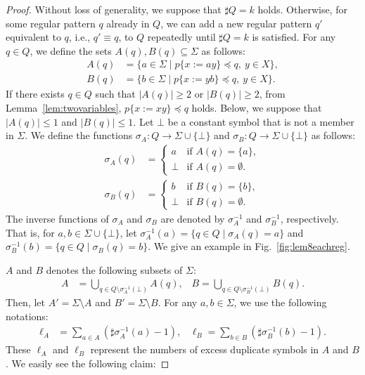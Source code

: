 \begin{proof}
Without loss of generality, we suppose that $\sharp Q = k$ holds. Otherwise, for some regular pattern $q$ already in $Q$, we can add a new regular pattern $q'$ equivalent to $q$, i.e., $q' \equiv q$, to $Q$ repeatedly until $\sharp Q = k$ is satisfied.
For any $q \in Q$, we define the sets $A(q), B(q) \subseteq \Sigma$ as follows:
\begin{align*}
  A(q) & = \{ a \in \Sigma \mid p \{ x:=ay \} \preceq q,\ y\in X\},\\ 
  B(q) & = \{ b \in \Sigma \mid p \{ x:=yb \} \preceq q,\ y\in X\}.
  \end{align*}
If there exists $q\in Q$ such that $|A(q)|\geq 2$ or $|B(q)|\geq 2$, from Lemma~\ref{lem:twovariables}, $p\{x := xy\} \preceq q$ holds.
Below, we suppose that $|A(q)|\leq 1$ and $|B(q)|\leq 1$.
Let $\bot$ be a constant symbol that is not a member in $\Sigma$.
We define the functions $\sigma_{A}: Q \rightarrow \Sigma \cup \{\bot\}$ and $\sigma_{B}: Q \rightarrow \Sigma \cup \{\bot\}$ as follows:
\begin{align*}
  \sigma_{A}(q) & =
  \begin{cases}
    a & \textrm{if } A(q) = \{a\}, \\
    \bot & \textrm{if } A(q) = \emptyset.
  \end{cases}\\
  \sigma_{B}(q) & =
  \begin{cases}
    b & \textrm{if } B(q) = \{b\}, \\
    \bot & \textrm{if } B(q) = \emptyset.
  \end{cases}
\end{align*}
The inverse functions of $\sigma_{A}$ and $\sigma_{B}$ are denoted by $\sigma_{A}^{-1}$ and $\sigma_{B}^{-1}$, respectively. That is, for $a,b \in \Sigma \cup \{\bot\}$, let $\sigma_{A}^{-1}(a) = \{q \in Q \mid \sigma_{A}(q) = a\}$ and $\sigma_{B}^{-1}(b) = \{q \in Q \mid \sigma_{B}(q) = b\}$. 
We give an example in Fig.~\ref{fig:lem8eachreg}.

$A$ and $B$ denotes the following subsets of $\Sigma$:
\begin{align*}
  A & = \bigcup_{q \in Q \setminus \sigma_{A}^{-1}(\bot)} A(q) \mbox{,~~~}
  B = \bigcup_{q \in Q \setminus \sigma_{B}^{-1}(\bot)} B(q).
\end{align*}
Then, let $A' = \Sigma \setminus A$ and $B' = \Sigma \setminus B$.
For any $a,b \in \Sigma$, we use the following notations:
\begin{align*}
  \ell_{A} &= \sum_{a \in A}(\sharp \sigma_{A}^{-1}(a) - 1) \mbox{,~~~}
  \ell_{B} = \sum_{b \in B}(\sharp \sigma_{B}^{-1}(b) - 1).
\end{align*}
These $\ell_{A}$ and $\ell_{B}$ represent the numbers of excess duplicate symbols in $A$ and $B$.
We easily see the following claim:  


\end{proof}
